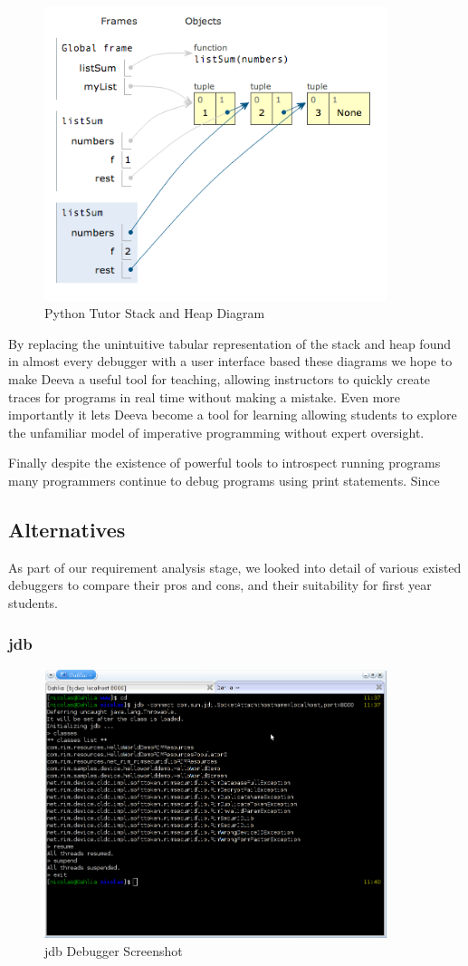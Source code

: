 \documentclass[11pt, a4paper]{article}
\begin{document}
\begin{figure}[h!]
\centering
\includegraphics[width=100mm]{PythonTutorStackHeap.png}
\caption{Python Tutor Stack and Heap Diagram}
\end{figure}

By replacing the unintuitive tabular representation of the stack and heap found in almost every debugger with a user interface based these diagrams we hope to make Deeva a useful tool for teaching,
allowing instructors to quickly create traces for programs in real time without making a mistake.
Even more importantly it lets Deeva become a tool for learning allowing students to explore the unfamiliar model of imperative programming without expert oversight.

Finally despite the existence of powerful tools to introspect running programs many programmers continue to debug programs using print statements.
Since



\subsection{Alternatives}
As part of our requirement analysis stage, we looked into detail of various existed debuggers to compare their pros and cons, and their suitability for first year students.

\subsubsection{jdb}
\begin{figure}[h!]
\centering
\includegraphics[width=100mm]{jdb.png}
\caption{jdb Debugger Screenshot}
\end{figure}
\end{document}
